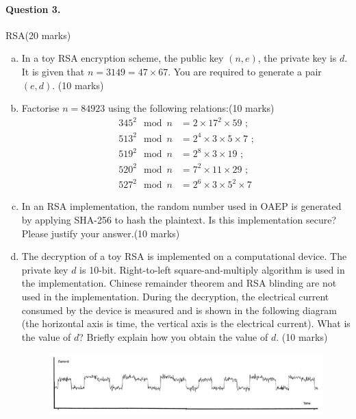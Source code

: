 \documentclass[12pt]{article}
\begin{document}
\paragraph{Question 3.}   RSA\hfill (20 marks)
\begin{enumerate}[(a)]
\item In a toy RSA encryption scheme, the public key $(n,e)$, the private key is $d$. It is given that $n=3149=47\times 67$. You are required to generate a pair $(e,d)$. \hfill (10 marks)
\item Factorise $n=84923$ using the following relations:\hfill (10 marks)\\
\begin{equation*}
\begin{split}
345^2\mod n&=2\times 17^2\times 59\text{ ;}\\
513^2\mod n&=2^4\times 3\times 5\times 7\text{ ;}\\
519^2\mod n&=2^8\times 3\times 19\text{ ;}\\
520^2\mod n&=7^2\times 11\times 29\text{ ;}\\
527^2\mod n&=2^6\times 3\times 5^2\times 7
\end{split}
\end{equation*}
\item In an RSA implementation, the random number used in OAEP is generated by applying SHA-256 to hash the plaintext. Is this implementation secure? Please justify your answer.\hfill (10 marks)
\item The decryption of a toy RSA is implemented on a computational device. The private key $d$ is 10-bit. Right-to-left square-and-multiply algorithm is used in the implementation. Chinese remainder theorem and RSA blinding are not used in the implementation. During the decryption, the electrical current consumed by the device is measured and is shown in the following diagram (the horizontal axis is time, the vertical axis is the electrical current). What is the value of $d$? Briefly explain how you obtain the value of $d$. \hfill (10 marks)
\begin{figure}[H]
\centering
\includegraphics[width=1\linewidth]{Capture}
\label{fig:capture}
\end{figure}
\end{enumerate}
\end{document}
